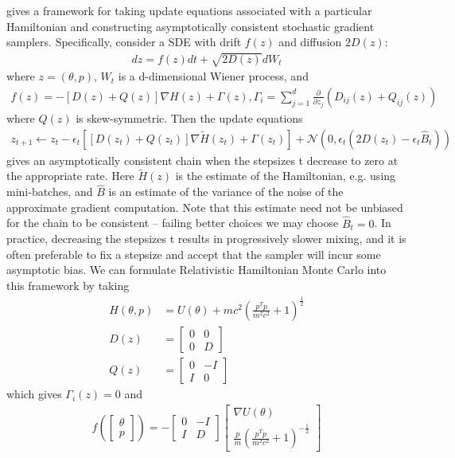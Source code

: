 \cite{Ma2015} gives a framework for taking update equations associated with a particular Hamiltonian and constructing asymptotically consistent stochastic gradient samplers. Specifically, \cite{Ma2015} consider a SDE with drift $f(z)$ and diffusion $2D(z)$:
\begin{eqnarray}
dz = f(z)dt + \sqrt{2D(z)}dW_t
\end{eqnarray}
where $z = (\theta, p)$, $W_t$ is a d-dimensional Wiener process, and
\begin{eqnarray}
f(z) = -\left[D(z)+Q(z)\right]\nabla H(z) + \Gamma(z), \Gamma_i = \sum_{j=1}^d\frac{\partial}{\partial z_j}\left(D_{ij}(z) + Q_{ij}(z)\right)
\end{eqnarray}
where $Q(z)$ is skew-symmetric. Then the update equations
\begin{eqnarray}
z_{t+1} \leftarrow z_t - \epsilon_t \left[\left[D(z_t)+Q(z_t)\right]\nabla \tilde{H}(z_t) + \Gamma(z_t)\right] + \mathcal{N}(0,\epsilon_t(2D(z_t)-\epsilon_t \hat{B}_t))\label{eq:MaUpdate}
\end{eqnarray}
gives an asymptotically consistent chain when the stepsizes t decrease to zero at the appropriate rate.  Here $\tilde{H}(z)$ is the estimate of the Hamiltonian, e.g. using mini-batches, and $\hat{B}$ is an estimate of the variance of the noise of the approximate gradient computation. Note
that this estimate need not be unbiased for the chain to be consistent – failing better choices we may choose $\hat{B}_t = 0$. In practice, decreasing the stepsizes t results in progressively slower mixing, and it is often preferable to fix a stepsize and accept that the sampler will incur
some asymptotic bias.
We can formulate Relativistic Hamiltonian Monte Carlo into this framework by taking
\begin{eqnarray}
H(\theta,p) &= U(\theta) + mc^2\left(\frac{p^Tp}{m^2c^2}+1\right)^{\frac{1}{2}}\\
D(z) &= \left[\begin{array}{cc} 0 & 0\\ 0 & D\end{array}\right]\\
Q(z) &= \left[\begin{array}{cc} 0 & -I\\ I & 0\end{array}\right]
\end{eqnarray}
which gives $\Gamma_i(z) = 0$ and 
\begin{eqnarray}
f\left(\left[\begin{array}{c}\theta\\ p\end{array}\right]\right) = - \left[\begin{array}{cc} 0 & -I\\ I & D\end{array}\right]\left[\begin{array}{c}\nabla U(\theta)\\
\frac{p}{m}\left(\frac{p^Tp}{m^2c^2}+1\right)^{-\frac{1}{2}} \end{array}\right]
\end{eqnarray}
